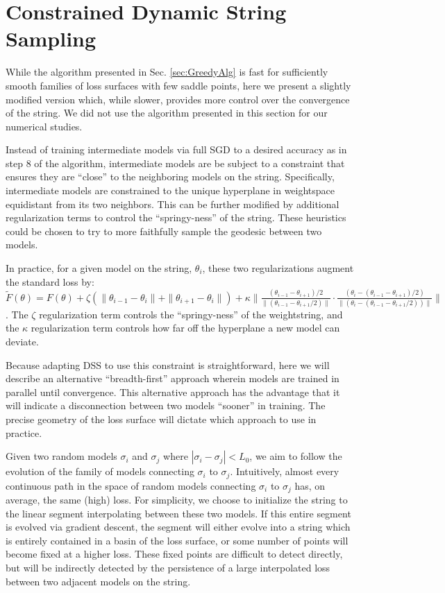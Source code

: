 \section{Constrained Dynamic String Sampling}
  \label{sec:ConstrainedAlg}
  
  While the algorithm presented in Sec. \ref{sec:GreedyAlg} is fast for sufficiently smooth families of loss surfaces with few saddle points, here we present a slightly modified version which, while slower, provides more control over the convergence of the string.  We did not use the algorithm presented in this section for our numerical studies.  
  
  Instead of training intermediate models via full SGD to a desired accuracy as in step $8$ of the algorithm, intermediate models are be subject to a constraint that ensures they are ``close'' to the neighboring models on the string.  Specifically, intermediate models are constrained to the unique hyperplane in weightspace equidistant from its two neighbors.  This can be further modified by additional regularization terms to control the ``springy-ness'' of the string.  These heuristics could be chosen to try to more faithfully sample the geodesic between two models.  
  
  In practice, for a given model on the string, $\theta_i$, these two regularizations augment the standard loss by: $\tilde{F}(\theta) = F(\theta)+\zeta(\|\theta_{i-1} - \theta_i\|+\|\theta_{i+1} - \theta_i\|) + \kappa \|\frac{(\theta_{i-1} - \theta_{i+1})/2}{\|(\theta_{i-1} - \theta_{i+1}/2)\|} \cdot \frac{(\theta_i - (\theta_{i-1} - \theta_{i+1})/2)}{\| (\theta_i - (\theta_{i-1} - \theta_{i+1}/2))\|}\|$.  The $\zeta$ regularization term controls the ``springy-ness'' of the weightstring, and the $\kappa$ regularization term controls how far off the hyperplane a new model can deviate.  
  
  Because adapting DSS to use this constraint is straightforward, here we will describe an alternative ``breadth-first'' approach wherein models are trained in parallel until convergence.  This alternative approach has the advantage that it will indicate a disconnection between two models ``sooner'' in training.  The precise geometry of the loss surface will dictate which approach to use in practice.
  
  Given two random models $\sigma_i$ and $\sigma_j$ where $|\sigma_i - \sigma_j| < L_0$, we aim to follow the evolution of the family of models connecting $\sigma_i$ to $\sigma_j$.  Intuitively, almost every continuous path in the space of random models connecting $\sigma_i$ to $\sigma_j$ has, on average, the same (high) loss.  For simplicity, we choose to initialize the string to the linear segment interpolating between these two models.  If this entire segment is evolved via gradient descent, the segment will either evolve into a string which is entirely contained in a basin of the loss surface, or some number of points will become fixed at a higher loss.  These fixed points are difficult to detect directly, but will be indirectly detected by the persistence of a large interpolated loss between two adjacent models on the string.
  
